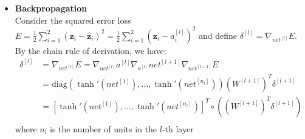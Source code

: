 \documentclass{exam}
\begin{document}
\begin{questions}
\begin{itemize}
\begin{align*}
\begin{bmatrix}
                \end{bmatrix} 
                \begin{bmatrix}
                    0.99892  \\
                    0.99892  \\
                \end{bmatrix} + 
                \begin{bmatrix}
                    0.0  \\
                    0.0  \\
                \end{bmatrix} \right)
                = 
                \begin{bmatrix}
                    0.0  \\
                    0.0  \\   
                \end{bmatrix}
            \end{align*}

            \item \textbf{Backpropagation} \\
            Consider the squared error loss $E = \frac{1}{2}\sum_{i = 1}^{2} (\mathbf{z}_i - \mathbf{\hat{z}}_i)^2 = \frac{1}{2}\sum_{i = 1}^{2} (\mathbf{z}_i - a_i^{[l]})^2$ and define $\delta^{[l]} = \nabla_{net^{[l]}} E$. By the chain rule of derivation, we have:
            \begin{align*}
                \delta^{[l]}& = \nabla_{net^{[l]}} E = \nabla_{net^{[l]}} a^{[l]} \nabla_{a^{[l]}} net^{[l+1]} \nabla_{net^{[l+1]}} E \\
                &= \text{diag}(\tanh'(net^{[1]}), ..., \tanh'(net^{[n_l]}))(W^{[l + 1]})^T\delta^{[l + 1]} \\
                &= [\tanh'(net^{[1]}), ..., \tanh'(net^{[n_l]})]^T \circ \left((W^{[l + 1]})^T\delta^{[l + 1]}\right)\\
            \end{align*}
            \vspace{-2em}
            where $n_l$ is the number of units in the $l$-th layer
        \end{itemize}
    \end{questions}
    
    
\end{document}
